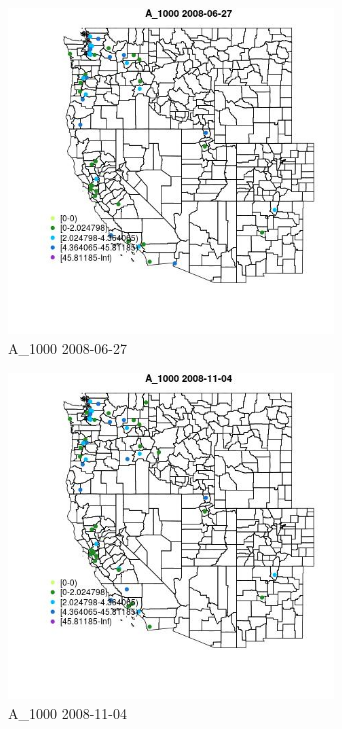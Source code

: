 \begin{figure} 
\centering  
\includegraphics[width=0.77\textwidth]{Code_Outputs/Report_ML_input_PM25_Step4_part_e_de_duplicated_aves_MapObsA_10002008-06-27.jpg} 
\caption{\label{fig:Report_ML_input_PM25_Step4_part_e_de_duplicated_avesMapObsA_10002008-06-27}A_1000 2008-06-27} 
\end{figure} 
 

\begin{figure} 
\centering  
\includegraphics[width=0.77\textwidth]{Code_Outputs/Report_ML_input_PM25_Step4_part_e_de_duplicated_aves_MapObsA_10002008-11-04.jpg} 
\caption{\label{fig:Report_ML_input_PM25_Step4_part_e_de_duplicated_avesMapObsA_10002008-11-04}A_1000 2008-11-04} 
\end{figure} 
 

